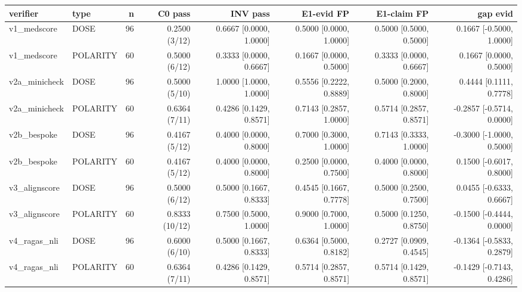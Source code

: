\begin{tabular}{llrrrrrr}
\hline
verifier & type & n & C0 pass & INV pass & E1-evid FP & E1-claim FP & gap evid \\
\hline
v1_medscore & DOSE & 96 & 0.2500 (3/12) & 0.6667 [0.0000, 1.0000] & 0.5000 [0.0000, 1.0000] & 0.5000 [0.5000, 0.5000] & 0.1667 [-0.5000, 1.0000] \\
v1_medscore & POLARITY & 60 & 0.5000 (6/12) & 0.3333 [0.0000, 0.6667] & 0.1667 [0.0000, 0.5000] & 0.3333 [0.0000, 0.6667] & 0.1667 [0.0000, 0.5000] \\
v2a_minicheck & DOSE & 96 & 0.5000 (5/10) & 1.0000 [1.0000, 1.0000] & 0.5556 [0.2222, 0.8889] & 0.5000 [0.2000, 0.8000] & 0.4444 [0.1111, 0.7778] \\
v2a_minicheck & POLARITY & 60 & 0.6364 (7/11) & 0.4286 [0.1429, 0.8571] & 0.7143 [0.2857, 1.0000] & 0.5714 [0.2857, 0.8571] & -0.2857 [-0.5714, 0.0000] \\
v2b_bespoke & DOSE & 96 & 0.4167 (5/12) & 0.4000 [0.0000, 0.8000] & 0.7000 [0.3000, 1.0000] & 0.7143 [0.3333, 1.0000] & -0.3000 [-1.0000, 0.5000] \\
v2b_bespoke & POLARITY & 60 & 0.4167 (5/12) & 0.4000 [0.0000, 0.8000] & 0.2500 [0.0000, 0.7500] & 0.4000 [0.0000, 0.8000] & 0.1500 [-0.6017, 0.8000] \\
v3_alignscore & DOSE & 96 & 0.5000 (6/12) & 0.5000 [0.1667, 0.8333] & 0.4545 [0.1667, 0.7778] & 0.5000 [0.2500, 0.7500] & 0.0455 [-0.6333, 0.6667] \\
v3_alignscore & POLARITY & 60 & 0.8333 (10/12) & 0.7500 [0.5000, 1.0000] & 0.9000 [0.7000, 1.0000] & 0.5000 [0.1250, 0.8750] & -0.1500 [-0.4444, 0.0000] \\
v4_ragas_nli & DOSE & 96 & 0.6000 (6/10) & 0.5000 [0.1667, 0.8333] & 0.6364 [0.5000, 0.8182] & 0.2727 [0.0909, 0.4545] & -0.1364 [-0.5833, 0.2879] \\
v4_ragas_nli & POLARITY & 60 & 0.6364 (7/11) & 0.4286 [0.1429, 0.8571] & 0.5714 [0.2857, 0.8571] & 0.5714 [0.1429, 0.8571] & -0.1429 [-0.7143, 0.4286] \\
\hline
\end{tabular}
